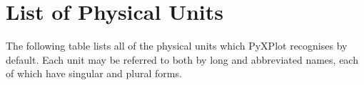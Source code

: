 %
%
%
%
%



\chapter{List of Physical Units}
\label{ch:unit_list}

The following table lists all of the physical units which PyXPlot recognises by default. Each unit may be referred to both by long and abbreviated names, each of which have singular and plural forms.

